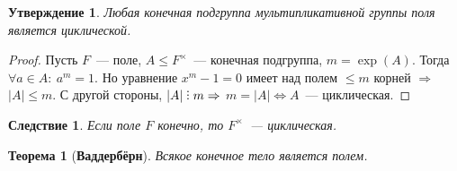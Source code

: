 \documentclass[a4paper, 14pt]{extarticle}
\DeclareRobustCommand{\divby}{%
	\mathrel{\text{\vbox{\baselineskip.65ex\lineskiplimit0pt\hbox{.}\hbox{.}\hbox{.}}}}%
}
\theoremstyle{definition}
\theoremstyle{plain}
\newtheorem*{theorem*}{Теорема}
\numberwithin{theorem}{section}
\numberwithin{definition}{section}
\newtheorem{statement}{Утверждение}
\numberwithin{statement}{section}
\numberwithin{lemma}{section}
\newtheorem*{consequence*}{Следствие}
\numberwithin{consequence}{section}
\begin{document}
        \begin{statement}
            Любая конечная подгруппа мультипликативной группы поля является циклической.
        \end{statement}
        \begin{proof}
            Пусть $F$~--- поле, ${A \leqslant F^\times}$~--- конечная подгруппа, ${m = \exp(A).}$ Тогда ${\forall a \in A{:} \ a^m = 1.}$ Но уравнение ${x^m - 1 = 0}$ имеет над полем $\leqslant m$ корней $\Rightarrow$ ${|A| \leqslant m}$. С другой стороны, ${|A| \divby m \Rightarrow}$ ${m = |A| \Leftrightarrow A}$~--- циклическая.
        \end{proof}
        \begin{consequence*}
            Если поле $F$ конечно, то $F^\times$~--- циклическая.
        \end{consequence*}
        \begin{theorem*}[\textbf{Ваддербёрн}]
            Всякое конечное тело является полем.
        \end{theorem*}
\end{document}
